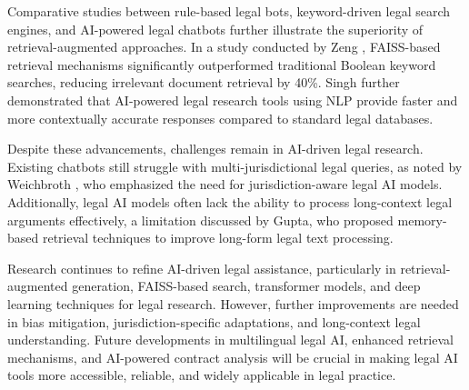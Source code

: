 Comparative studies between rule-based legal bots, keyword-driven legal search engines, and AI-powered legal chatbots further illustrate the superiority of retrieval-augmented approaches. In a study conducted by Zeng \cite{zeng2024scalable}, FAISS-based retrieval mechanisms significantly outperformed traditional Boolean keyword searches, reducing irrelevant document retrieval by 40\%. Singh \cite{10760929} further demonstrated that AI-powered legal research tools using NLP provide faster and more contextually accurate responses compared to standard legal databases.  

Despite these advancements, challenges remain in AI-driven legal research. Existing chatbots still struggle with multi-jurisdictional legal queries, as noted by Weichbroth \cite{Weichbroth2025AIAT}, who emphasized the need for jurisdiction-aware legal AI models. Additionally, legal AI models often lack the ability to process long-context legal arguments effectively, a limitation discussed by Gupta, who proposed memory-based retrieval techniques to improve long-form legal text processing.  

Research continues to refine AI-driven legal assistance, particularly in retrieval-augmented generation, FAISS-based search, transformer models, and deep learning techniques for legal research. However, further improvements are needed in bias mitigation, jurisdiction-specific adaptations, and long-context legal understanding. Future developments in multilingual legal AI, enhanced retrieval mechanisms, and AI-powered contract analysis will be crucial in making legal AI tools more accessible, reliable, and widely applicable in legal practice.